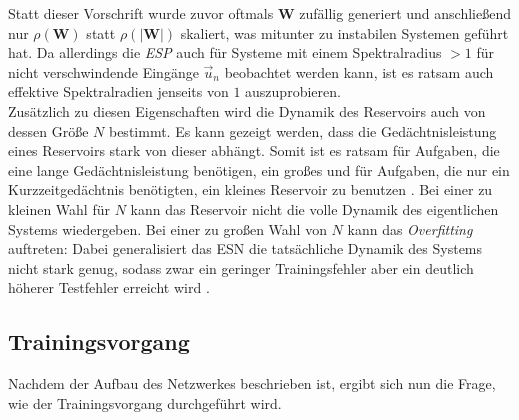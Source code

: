 Statt dieser Vorschrift wurde zuvor oftmals $\mathbf{W}$ zufällig generiert und anschließend nur $\rho(\mathbf{W})$ statt $\rho(|\mathbf{W}|)$ skaliert, was mitunter zu instabilen Systemen geführt hat. Da allerdings die \textit{ESP} auch für Systeme mit einem Spektralradius $ > 1$ für nicht verschwindende Eingänge $\vec{u}_n$ beobachtet werden kann, ist es ratsam auch effektive Spektralradien jenseits von $1$ auszuprobieren.\\

Zusätzlich zu diesen Eigenschaften wird die Dynamik des Reservoirs auch von dessen Größe $N$ bestimmt. Es kann gezeigt werden, dass die Gedächtnisleistung eines Reservoirs stark von dieser abhängt. Somit ist es ratsam für Aufgaben, die eine lange Gedächtnisleistung benötigen, ein großes und für Aufgaben, die nur ein Kurzzeitgedächtnis benötigten, ein kleines Reservoir zu benutzen \citep{jeagerTut2002}. Bei einer zu kleinen Wahl für $N$ kann das Reservoir nicht die volle Dynamik des eigentlichen Systems wiedergeben. Bei einer zu großen Wahl von $N$ kann das \textit{Overfitting} auftreten: Dabei generalisiert das \textsc{ESN} die tatsächliche Dynamik des Systems nicht stark genug, sodass zwar ein geringer Trainingsfehler aber ein deutlich höherer Testfehler erreicht wird \citep{jeagerTut2002}.


\subsection{Trainingsvorgang}
Nachdem der Aufbau des Netzwerkes beschrieben ist, ergibt sich nun die Frage, wie der Trainingsvorgang durchgeführt wird.

